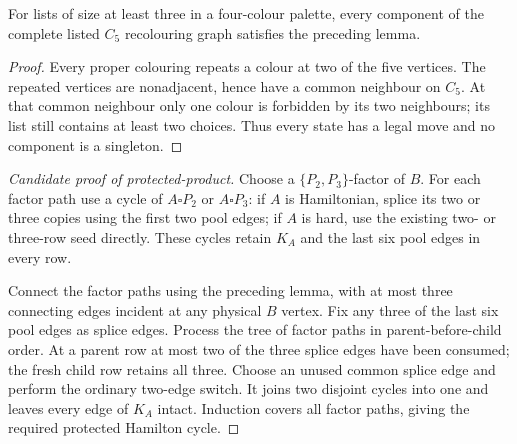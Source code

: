 \begin{corollary}
For lists of size at least three in a four-colour palette, every
component of the complete listed $C_5$ recolouring graph satisfies
the preceding lemma.
\end{corollary}
\begin{proof}
Every proper colouring repeats a colour at two of the five vertices.
The repeated vertices are nonadjacent, hence have a common neighbour
on $C_5$. At that common neighbour only one colour is forbidden by
its two neighbours; its list still contains at least two choices.
Thus every state has a legal move and no component is a singleton.
\end{proof}

\begin{proof}[Candidate proof of protected-product]
Choose a $\{P_2,P_3\}$-factor of $B$. For each factor path use a
cycle of $A\square P_2$ or $A\square P_3$: if $A$ is Hamiltonian,
splice its two or three copies using the first two pool edges;
if $A$ is hard, use the existing two- or three-row seed directly.
These cycles retain $K_A$ and the last six pool edges in every row.

Connect the factor paths using the preceding lemma, with at most
three connecting edges incident at any physical $B$ vertex. Fix any
three of the last six pool edges as splice edges. Process the tree
of factor paths in parent-before-child order. At a parent row at most
two of the three splice edges have been consumed; the fresh child
row retains all three. Choose an unused common splice edge and
perform the ordinary two-edge switch. It joins two disjoint cycles
into one and leaves every edge of $K_A$ intact. Induction covers all
factor paths, giving the required protected Hamilton cycle.
\end{proof}

